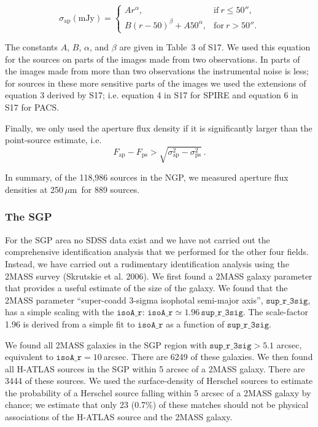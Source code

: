 \documentclass[a4paper,fleqn,usenatbib, twocolumn]{aastex61}
\def\mic{\,$\mu $m}
\begin{document}
\begin{equation}
  \sigma_{\mathrm{ap}}(\mathrm{mJy}) =
  \begin{cases}
      Ar^\alpha , &   \mathrm{if\ } r\le 50'' ,\\
      B(r-50)^\beta + A 50^\alpha , & \mathrm{for\ } r>50''.
    \end{cases}
\end{equation}

The constants $A$, $B$, $\alpha$, and $\beta$ are given in Table~3 of
S17.  We used this equation for the sources on parts of the images
made from two observations. In parts of the images made from more than
two observations the instrumental noise is less; for sources in these
more sensitive parts of the images we used the extensions of equation
3 derived by S17; i.e. equation 4 in S17 for SPIRE and equation 6 in
S17 for PACS.

Finally, we only used the aperture flux density if
it is significantly larger than the point-source estimate, i.e.
\begin{equation}
F_\mathrm{ap}- F_\mathrm{ps}>\sqrt{\sigma_\mathrm{ap}^2-\sigma_\mathrm{ps}^2}
\ .
\end{equation}

In summary, of the 118,986 sources in the NGP, we measured aperture
flux densities at 250\mic\ for 889 sources. 

\subsubsection{The SGP}

For the SGP area no SDSS data exist and we have not carried out the
comprehensive identification analysis that we performed for the other
four fields. Instead, we have carried out a rudimentary identification
analysis using the 2MASS survey (Skrutskie et al. 2006). We first
found a 2MASS galaxy parameter that provides a useful estimate of the
size of the galaxy. We found that the 2MASS parameter ``super-coadd
3-sigma isophotal semi-major axis'', $\mathtt{sup\_r\_3sig}$, has a
simple scaling with the $\mathtt {isoA\_r}$:
$\mathtt{isoA\_r} \simeq 1.96\, \mathtt{sup\_r\_3sig}$.  The
scale-factor 1.96 is derived from a simple fit to $\mathtt{isoA\_r}$
as a function of $\mathtt{sup\_r\_3sig}$.
  
We found all 2MASS galaxies in the SGP region with
$\mathtt{sup\_r\_3sig}>5.1$ arcsec, equivalent to
$\mathtt{isoA\_r}=10\ $arcsec. There are 6249 of these galaxies. We
then found all H-ATLAS sources in the SGP within 5 arcsec of a 2MASS
galaxy. There are 3444 of these sources. We used the surface-density
of Herschel sources to estimate the probability of a Herschel source
falling within 5 arcsec of a 2MASS galaxy by chance; we estimate that
only 23 (0.7\%) of these matches should not be physical associations
of the H-ATLAS source and the 2MASS galaxy.
\end{document}
